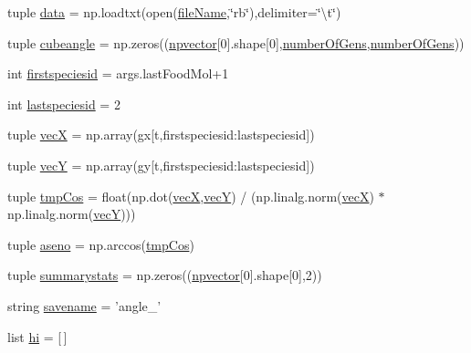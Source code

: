 \begin{DoxyCompactItemize}
tuple \hyperlink{a00090_a6b62fbc94ad1a2b022ec05389a1a5da8}{data} = np.\-loadtxt(open(\hyperlink{a00090_adbcd9cfa3b0b922cf1d708519535f6da}{file\-Name},\char`\"{}rb\char`\"{}),delimiter=\char`\"{}\textbackslash{}t\char`\"{})
\item 
tuple \hyperlink{a00090_aa7a5bbed8bb957c1d48a86d058e9dba9}{cubeangle} = np.\-zeros((\hyperlink{a00090_a5ba3601fadf52ac203118473b6c4db3e}{npvector}\mbox{[}0\mbox{]}.shape\mbox{[}0\mbox{]},\hyperlink{a00090_a2dc25dc1c0af14713786b9004cd602f7}{number\-Of\-Gens},\hyperlink{a00090_a2dc25dc1c0af14713786b9004cd602f7}{number\-Of\-Gens}))
\item 
int \hyperlink{a00090_a3d5bd3fb43b0cae106d2b05c22d64b1c}{firstspeciesid} = args.\-last\-Food\-Mol+1
\item 
int \hyperlink{a00090_ab78a312c378cd8ff7fc988f15165b0af}{lastspeciesid} = 2
\item 
tuple \hyperlink{a00090_ada59022b084d32f959c70d980c256873}{vec\-X} = np.\-array(gx\mbox{[}t,firstspeciesid\-:lastspeciesid\mbox{]})
\item 
tuple \hyperlink{a00090_af9dceee4ca99d15e7b95905f674ceda5}{vec\-Y} = np.\-array(gy\mbox{[}t,firstspeciesid\-:lastspeciesid\mbox{]})
\item 
tuple \hyperlink{a00090_afb0b11c375d9982cee623e5be776e6b1}{tmp\-Cos} = float(np.\-dot(\hyperlink{a00090_ada59022b084d32f959c70d980c256873}{vec\-X},\hyperlink{a00090_af9dceee4ca99d15e7b95905f674ceda5}{vec\-Y}) / (np.\-linalg.\-norm(\hyperlink{a00090_ada59022b084d32f959c70d980c256873}{vec\-X}) $\ast$ np.\-linalg.\-norm(\hyperlink{a00090_af9dceee4ca99d15e7b95905f674ceda5}{vec\-Y})))
\item 
tuple \hyperlink{a00090_ac5c8e440ab927fcfdf1bc4411d0f901c}{aseno} = np.\-arccos(\hyperlink{a00090_afb0b11c375d9982cee623e5be776e6b1}{tmp\-Cos})
\item 
tuple \hyperlink{a00090_ace6fb423ddbe7dd4b6e1d2828c8b05af}{summarystats} = np.\-zeros((\hyperlink{a00090_a5ba3601fadf52ac203118473b6c4db3e}{npvector}\mbox{[}0\mbox{]}.shape\mbox{[}0\mbox{]},2))
\item 
string \hyperlink{a00090_a8c361074d6e19ebcfb4f61f18cb8be4c}{savename} = 'angle\-\_\-'
\item 
list \hyperlink{a00090_af953e69c8207cf7aada9e39d5ccd4ae3}{hi} = \mbox{[}$\,$\mbox{]}
\end{DoxyCompactItemize}


